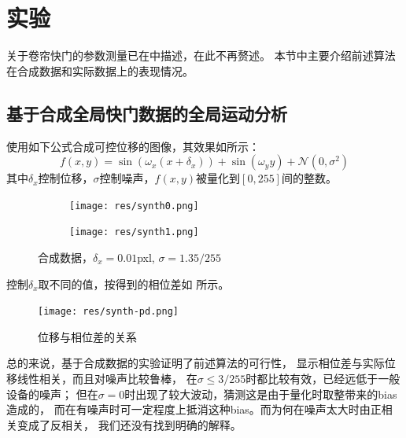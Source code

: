 
\section{实验}
关于卷帘快门的参数测量已在中描述，在此不再赘述。
本节中主要介绍前述算法在合成数据和实际数据上的表现情况。

\subsection{基于合成全局快门数据的全局运动分析\label{sec:synth-global}}
使用如下公式合成可控位移的图像，其效果如所示：
\begin{equation}
    f(x, y) = \sin(\omega_x (x + \delta_x)) + \sin(\omega_y y) + 
    \mathcal{N}(0, \sigma^2)
    \label{eqn:synth-global}
\end{equation}
其中$\delta_x$控制位移，$\sigma$控制噪声，$f(x, y)$被量化到$[0, 255]$间的整数。
\begin{figure}[h!]\begin{center}
    \begin{subfigure}[b]{.35\figwidth}
        \centering
        \texttt{[image: res/synth0.png]}
    \end{subfigure}
    \begin{subfigure}[b]{.35\figwidth}
        \centering
        \texttt{[image: res/synth1.png]}
    \end{subfigure}
    \caption{合成数据，$\delta_x = 0.01$pxl, $\sigma = 1.35/255$}
    \label{fig:synthesis}
\end{center}\end{figure}

控制$\delta_x$取不同的值，按得到的相位差如
所示。
\begin{figure}[h!]\begin{center}
    \texttt{[image: res/synth-pd.png]}
    \caption{位移与相位差的关系}
    \label{fig:synthesis:pd}
\end{center}\end{figure}

总的来说，基于合成数据的实验证明了前述算法的可行性，
显示相位差与实际位移线性相关，而且对噪声比较鲁棒，
在$\sigma \le 3/255$时都比较有效，已经远低于一般设备的噪声；
但在$\sigma=0$时出现了较大波动，猜测这是由于量化时取整带来的bias造成的，
而在有噪声时可一定程度上抵消这种bias。而为何在噪声太大时由正相关变成了反相关，
我们还没有找到明确的解释。

